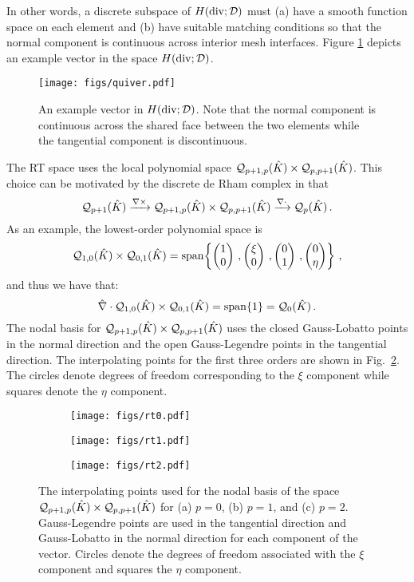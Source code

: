 \documentclass[../doc.tex]{subfiles}
\begin{document}
In other words, a discrete subspace of $H(\operatorname{div};\mathcal{D})$ must (a) have a smooth function space on each element and (b) have suitable matching conditions so that the normal component is continuous across interior mesh interfaces. 
Figure \ref{fem:quiver} depicts an example vector in the space $H(\operatorname{div};\mathcal{D})$. 
\begin{figure}
	\centering
	\texttt{[image: figs/quiver.pdf]}
	\caption{An example vector in $H(\operatorname{div};\mathcal{D})$. Note that the normal component is continuous across the shared face between the two elements while the tangential component is discontinuous. }
	\label{fem:quiver}
\end{figure}

The RT space uses the local polynomial space $\mathcal{Q}_{p+1,p}(\hat{K}) \times \mathcal{Q}_{p,p+1}(\hat{K})$. This choice can be motivated by the discrete de Rham complex \cite{mfem_brezzi} in that 
	\begin{equation}
		\mathcal{Q}_{p+1}(\hat{K}) \xrightarrow{\nabla\times} \mathcal{Q}_{p+1,p}(\hat{K})\times \mathcal{Q}_{p,p+1}(\hat{K}) \xrightarrow{\nabla\cdot} \mathcal{Q}_{p}(\hat{K}) \,. 
	\end{equation}
As an example, the lowest-order polynomial space is
	\begin{equation}
		\mathcal{Q}_{1,0}(\hat{K}) \times \mathcal{Q}_{0,1}(\hat{K}) = \operatorname{span}\!\left\{ \begin{pmatrix} 1 \\ 0 \end{pmatrix}\,, \begin{pmatrix} \xi \\ 0 \end{pmatrix} \,, \begin{pmatrix} 0 \\ 1 \end{pmatrix} \,, \begin{pmatrix} 0 \\ \eta \end{pmatrix} \right\} \,, 
	\end{equation}
and thus we have that: 
	\begin{equation}
		\hat{\nabla}\cdot \mathcal{Q}_{1,0}(\hat{K}) \times \mathcal{Q}_{0,1}(\hat{K}) = \operatorname{span}\!\left\{ 1 \right\} = \mathcal{Q}_{0}(\hat{K}) \,. 
	\end{equation}
The nodal basis for $\mathcal{Q}_{p+1,p}(\hat{K}) \times \mathcal{Q}_{p,p+1}(\hat{K})$ uses the closed Gauss-Lobatto points in the normal direction and the open Gauss-Legendre points in the tangential direction. The interpolating points for the first three orders are shown in Fig.~\ref{fem:rt_local_poly}. The circles denote degrees of freedom corresponding to the $\xi$ component while squares denote the $\eta$ component. 
\begin{figure}
\centering
\begin{subfigure}{.25\textwidth}
	\centering
	\texttt{[image: figs/rt0.pdf]}
	\caption{}
\end{subfigure}\qquad
\begin{subfigure}{.25\textwidth}
	\centering
	\texttt{[image: figs/rt1.pdf]}
	\caption{}
\end{subfigure}\qquad
\begin{subfigure}{.25\textwidth}
	\centering
	\texttt{[image: figs/rt2.pdf]}
	\caption{}
\end{subfigure}
\caption{The interpolating points used for the nodal basis of the space $\mathcal{Q}_{p+1,p}(\hat{K})\times \mathcal{Q}_{p,p+1}(\hat{K})$ for (a) $p=0$, (b) $p=1$, and (c) $p=2$. Gauss-Legendre points are used in the tangential direction and Gauss-Lobatto in the normal direction for each component of the vector. Circles denote the degrees of freedom associated with the $\xi$ component and squares the $\eta$ component. }
\label{fem:rt_local_poly}
\end{figure}
\end{document}
